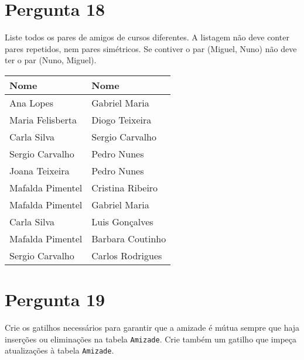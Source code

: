 {\section{Pergunta 18}
Liste todos os pares de amigos de cursos diferentes. A listagem não deve conter pares repetidos, nem pares simétricos. Se contiver o par (Miguel, Nuno) não deve ter o par (Nuno, Miguel).
\begin{center} \begin{tabular}{l l}
    \textbf{Nome}    & \textbf{Nome}    \\ \hline
    Ana Lopes        & Gabriel Maria    \\
    Maria Felisberta & Diogo Teixeira   \\
    Carla Silva      & Sergio Carvalho  \\
    Sergio Carvalho  & Pedro Nunes      \\
    Joana Teixeira   & Pedro Nunes      \\
    Mafalda Pimentel & Cristina Ribeiro \\
    Mafalda Pimentel & Gabriel Maria    \\
    Carla Silva      & Luis Gonçalves   \\
    Mafalda Pimentel & Barbara Coutinho \\
    Sergio Carvalho  & Carlos Rodrigues
\end{tabular} \end{center}


\section{Pergunta 19}
Crie os gatilhos necessários para garantir que a amizade é mútua sempre que haja inserções ou eliminações na tabela \texttt{Amizade}. Crie também um gatilho que impeça atualizações à tabela \texttt{Amizade}.


}
